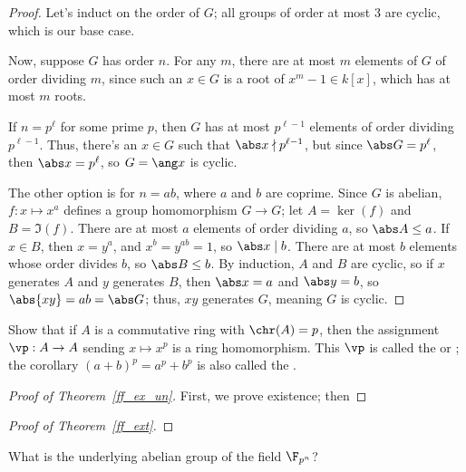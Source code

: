 \begin{proof}
Let's induct on the order of $G$; all groups of order at most $3$ are cyclic, which is our base case.

Now, suppose $G$ has order $n$. For any $m$, there are at most $m$ elements of $G$ of order dividing $m$, since
such an $x\in G$ is a root of $x^m - 1\in k[x]$, which has at most $m$ roots.

If $n = p^\ell$ for some prime $p$, then $G$ has at most $p^{\ell-1}$ elements of order dividing $p^{\ell-1}$.
Thus, there's an $x\in G$ such that $\abs x\nmid p^{\ell-1}$, but since $\abs G = p^\ell$, then $\abs x = p^\ell$,
so $G = \ang x$ is cyclic.

The other option is for $n = ab$, where $a$ and $b$ are coprime. Since $G$ is abelian, $f:x\mapsto x^a$ defines a
group homomorphism $G\to G$; let $A = \ker(f)$ and $B = \Im(f)$. There are at most $a$ elements of order dividing
$a$, so $\abs A\le a$. If $x\in B$, then $x = y^a$, and $x^b = y^{ab} = 1$, so $\abs x\mid b$. There are at most
$b$ elements whose order divides $b$, so $\abs B\le b$. By induction, $A$ and $B$ are cyclic, so if $x$ generates
$A$ and $y$ generates $B$, then $\abs x = a$ and $\abs y = b$, so $\abs{xy} = ab = \abs G$; thus, $xy$ generates
$G$, meaning $G$ is cyclic.
\end{proof}
\begin{ex}
Show that if $A$ is a commutative ring with $\chr(A) = p$, then the assignment $\vp:A\to A$ sending $x\mapsto x^p$
is a ring homomorphism. This $\vp$ is called the  or ;
the corollary $(a+b)^p = a^p + b^p$ is also called the .
\end{ex}
\begin{proof}[Proof of Theorem~\ref{ff_ex_un}]
First, we prove existence; then


\end{proof}
\begin{proof}[Proof of Theorem~\ref{ff_ext}]

\end{proof}
\begin{ex}
What is the underlying abelian group of the field $\F_{p^n}$?
\end{ex}
